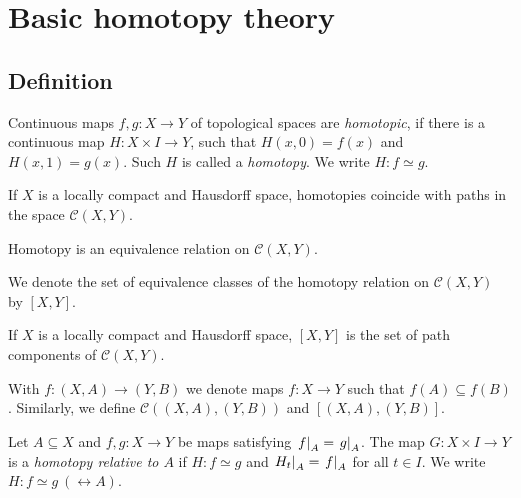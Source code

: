 \section{Basic homotopy theory}

\subsection{Definition}


\begin{definicija}
Continuous maps $f, g \colon X \to Y$ of topological spaces are
\emph{homotopic}, if there is a continuous map
$H \colon X \times I \to Y$, such that $H(x, 0) = f(x)$ and
$H(x, 1) = g(x)$. Such $H$ is called a
\emph{homotopy}. We write $H \colon f \simeq g$.
\end{definicija}

\begin{opomba}
If $X$ is a locally compact and Hausdorff space, homotopies
coincide with paths in the space $\mathcal{C}(X, Y)$.
\end{opomba}

\begin{trditev}
Homotopy is an equivalence relation on $\mathcal{C}(X, Y)$.
\end{trditev}

\obvs

\begin{definicija}
We denote the set of equivalence classes of the homotopy relation
on $\mathcal{C}(X, Y)$ by $[X, Y]$.
\end{definicija}

\begin{opomba}
If $X$ is a locally compact and Hausdorff space, $[X, Y]$ is the
set of path components of $\mathcal{C}(X, Y)$.
\end{opomba}

\begin{definicija}
With $f \colon (X, A) \to (Y, B)$ we denote maps $f \colon X \to Y$
such that $f(A) \subseteq f(B)$. Similarly, we define
$\mathcal{C}( (X, A), (Y, B))$ and $[(X,A), (Y,B)]$.
\end{definicija}

\begin{definicija}
Let $A \subseteq X$ and $f, g \colon X \to Y$ be maps satisfying
$\left. f\right|_{A}^{} = \left. g\right|_{A}^{}$. The map
$G \colon X \times I \to Y$ is a
\emph{homotopy relative to $A$}
if $H \colon f \simeq g$ and $\left. H_t\right|_{A}^{} = \left. f\right|_{A}^{}$ for
all $t \in I$. We write $H \colon f \simeq g~(\rel A)$.
\end{definicija}

